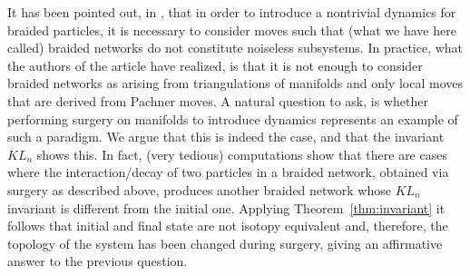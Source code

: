 \documentclass[aps,nofootinbib,amsfonts,superscriptaddress]{revtex4}
\begin{document}
It has been pointed out, in \cite{BT2}, that in order to introduce a nontrivial dynamics for braided particles, it is necessary to consider moves such that (what we have here called) braided networks do not constitute noiseless subsystems. In practice, what the authors of the article \cite{BT2} have realized, is that it is not enough to consider braided networks as arising from triangulations of manifolds and only local moves that are derived from Pachner moves. A natural question to ask, is whether performing surgery on manifolds to introduce dynamics represents an example of such a paradigm. We argue that this is indeed the case, and that the invariant $KL_n$ shows this. In fact, (very tedious) computations show that there are cases where the interaction/decay of two particles in a braided network, obtained via surgery as described above, produces another braided network whose $KL_n$ invariant is different from the initial one. Applying Theorem~\ref{thm:invariant} it follows that initial and final state are not isotopy equivalent and, therefore, the topology of the system has been changed during surgery, giving an affirmative answer to the previous question.  \\
\end{document}
